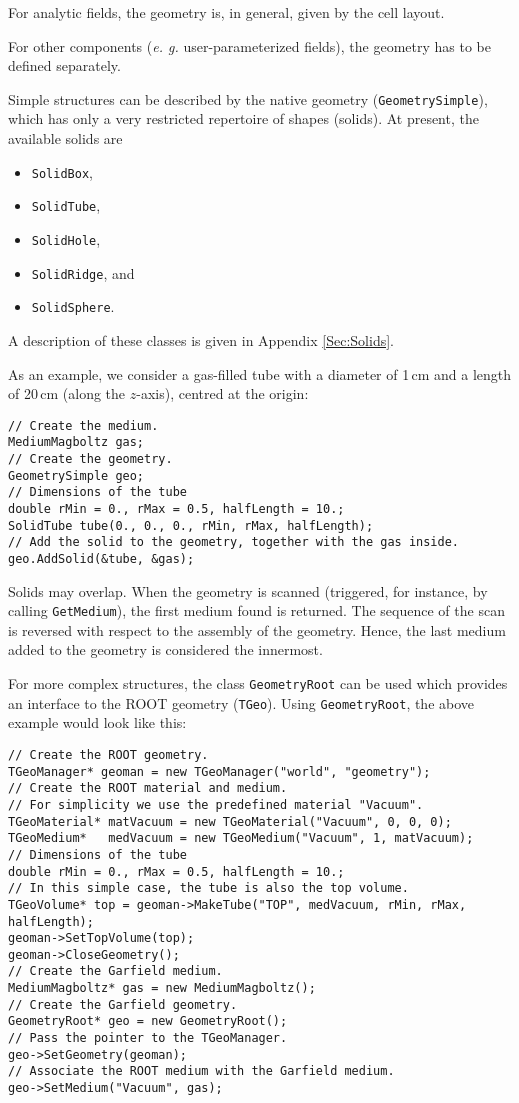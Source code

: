 For analytic fields, the geometry is, in general, given by the 
cell layout.

For other components (\textit{e. g.} user-parameterized fields), 
the geometry has to be defined separately. 

Simple structures can be described by the native geometry (\texttt{GeometrySimple}), which has only a very restricted repertoire of shapes (solids). 
At present, the available solids are
\begin{itemize}
  \item
  \texttt{SolidBox}, 
  \item
  \texttt{SolidTube}, 
  \item
  \texttt{SolidHole}, 
  \item
  \texttt{SolidRidge}, and
  \item
  \texttt{SolidSphere}.
\end{itemize} 
A description of these classes is given in Appendix \ref{Sec:Solids}.

As an example, we consider a gas-filled tube with a diameter of 1\,cm and 
a length of 20\,cm (along the \(z\)-axis), centred at the origin:
\begin{lstlisting}
// Create the medium.
MediumMagboltz gas;
// Create the geometry.
GeometrySimple geo;
// Dimensions of the tube
double rMin = 0., rMax = 0.5, halfLength = 10.;
SolidTube tube(0., 0., 0., rMin, rMax, halfLength);
// Add the solid to the geometry, together with the gas inside.
geo.AddSolid(&tube, &gas);
\end{lstlisting}

Solids may overlap. 
When the geometry is scanned 
(triggered, for instance, by calling \texttt{GetMedium}), the  
first medium found is returned. 
The sequence of the scan is reversed with respect to the 
assembly of the geometry. 
Hence, the last medium added to the geometry is considered the innermost. 

For more complex structures, the class \texttt{GeometryRoot} can be used 
which provides an interface to the ROOT geometry (\texttt{TGeo}).
Using \texttt{GeometryRoot}, the above example would look like this:
\begin{lstlisting}
// Create the ROOT geometry.
TGeoManager* geoman = new TGeoManager("world", "geometry");
// Create the ROOT material and medium. 
// For simplicity we use the predefined material "Vacuum".
TGeoMaterial* matVacuum = new TGeoMaterial("Vacuum", 0, 0, 0);
TGeoMedium*   medVacuum = new TGeoMedium("Vacuum", 1, matVacuum);
// Dimensions of the tube
double rMin = 0., rMax = 0.5, halfLength = 10.;
// In this simple case, the tube is also the top volume.
TGeoVolume* top = geoman->MakeTube("TOP", medVacuum, rMin, rMax, halfLength);
geoman->SetTopVolume(top);
geoman->CloseGeometry();
// Create the Garfield medium.
MediumMagboltz* gas = new MediumMagboltz();
// Create the Garfield geometry.
GeometryRoot* geo = new GeometryRoot();
// Pass the pointer to the TGeoManager.
geo->SetGeometry(geoman);
// Associate the ROOT medium with the Garfield medium.
geo->SetMedium("Vacuum", gas); 
\end{lstlisting} 

